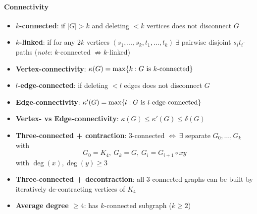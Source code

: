 \paragraph{Connectivity}
\begin{itemize}
  \item \textbf{$ k $-connected}: if $ \vert G \vert > k $ and deleting $ < k $ vertices does not disconnect $ G $
  \item \textbf{$ k $-linked}: if for any $ 2k $ vertices $ (s_1, \dots, s_k, t_1, \dots, t_k) \ \exists $ pairwise disjoint $ s_it_i $-paths (\emph{note}: $ k $-connected $ \not \Rightarrow k $-linked)
  \item \textbf{Vertex-connectivity}: $ \kappa(G) = \max\{ k : \text{$ G $ is $ k $-connected} \} $
  \item \textbf{$ l $-edge-connected}: if deleting $ < l $ edges does not disconnect $ G $
  \item \textbf{Edge-connectivity}: $ \kappa'(G) = \max\{ l : \text{$ G $ is $ l $-edge-connected} \} $
  \item \textbf{Vertex- vs Edge-connectivity}: $ \kappa(G) \leq \kappa'(G) \leq \delta(G) $
  \item \textbf{Three-connected + contraction}: $ 3 $-connected $ \Leftrightarrow \ \exists $ separate $ G_0, \dots, G_k $ with
  \begin{equation*}
    G_0 = K_4, \ G_k = G, \ G_i = G_{i+1} \circ xy
  \end{equation*}
  with $ \deg(x), \deg(y) \geq 3 $
  \item \textbf{Three-connected + decontraction}: all $ 3 $-connected graphs can be built by iteratively de-contracting vertices of $ K_4 $
  \item \textbf{Average degree $ \geq 4 $}: has $ k $-connected subgraph ($ k \geq 2 $)
\end{itemize}


